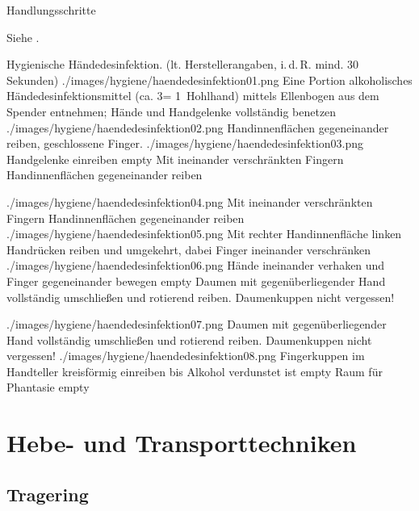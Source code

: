 \documentclass[
ngerman,
paper=a4,
asymmetric,
fontsize=8pt,
draft=false,
numbers=noenddot,
bibtotocnumbered,
footnotes=multiple,
toc=flat,
]{scrbook}
\begin{document}
\TextSlide
{Handlungsschritte}
{Siehe .


\begin{PictureSeriesWide}{}{Hygienische Händedesinfektion.  (lt.
Herstellerangaben, i.\,d.\,R. mind. 30 Sekunden)
\label{fig:haendedesinfektion}}
{./images/hygiene/haendedesinfektion01.png}
{Eine Portion alkoholisches
    Händedesinfektionsmittel (ca. 3\Ml* = 1~Hohlhand)
    mittels Ellenbogen aus dem Spen\-der entnehmen; Hände
    und Handgelenke vollständig benetzen}
{./images/hygiene/haendedesinfektion02.png}
{Handinnenflächen gegeneinander reiben, geschlossene Finger.}
{./images/hygiene/haendedesinfektion03.png}
{Handgelenke einreiben}
{empty}
{Mit ineinander verschränkten Fingern Handinnenflächen
    gegeneinander reiben}

{./images/hygiene/haendedesinfektion04.png}
{Mit ineinander verschränkten Fingern Handinnenflächen
    gegeneinander reiben}
{./images/hygiene/haendedesinfektion05.png}
{Mit rechter Handinnenfläche linken Handrücken reiben und
    umgekehrt, dabei Finger ineinander verschränken}
{./images/hygiene/haendedesinfektion06.png}
{Hände ineinander verhaken und Finger gegeneinander bewegen}
{empty}
{Daumen mit gegenüberliegender Hand vollständig umschließen
    und rotierend reiben. Daumenkuppen nicht vergessen!}
    
{./images/hygiene/haendedesinfektion07.png}
{Daumen mit gegenüberliegender Hand vollständig umschließen
    und rotierend reiben. Daumenkuppen nicht vergessen!}
{./images/hygiene/haendedesinfektion08.png}
{Fingerkuppen im Handteller kreisförmig einreiben bis Alkohol
    verdunstet ist}
{empty}
{Raum für Phantasie}
{empty}
{}
\end{PictureSeriesWide}}
{}
{}
{}
{}

\nocite{KirschnickPflege2}



\section{Hebe- und Transporttechniken}


\subsection{Tragering}

\label{topic:tragering}
\end{document}
